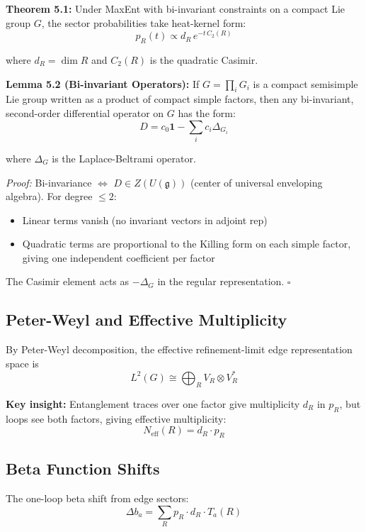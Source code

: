 \textbf{Theorem 5.1:} Under MaxEnt with bi-invariant constraints on a compact Lie group \(G\), the sector probabilities take heat-kernel form: \[p_R(t) \propto d_R \, e^{-t \, C_2(R)}\]

where \(d_R = \dim R\) and \(C_2(R)\) is the quadratic Casimir.

\textbf{Lemma 5.2 (Bi-invariant Operators):} If \(G=\prod_i G_i\) is a compact semisimple Lie group written as a product of compact simple factors, then any bi-invariant, second-order differential operator on \(G\) has the form: \[D = c_0 \mathbf{1} - \sum_i c_i \Delta_{G_i}\]

where \(\Delta_G\) is the Laplace-Beltrami operator.

\emph{Proof:} Bi-invariance \(\Leftrightarrow\) \(D \in Z(U(\mathfrak{g}))\) (center of universal enveloping algebra). For degree \(\leq 2\):

\begin{itemize}
\tightlist
\item
 Linear terms vanish (no invariant vectors in adjoint rep)
\item
 Quadratic terms are proportional to the Killing form on each simple factor, giving one independent coefficient per factor
\end{itemize}

The Casimir element acts as \(-\Delta_G\) in the regular representation. \(\square\)

\subsection{Peter-Weyl and Effective Multiplicity}\label{54-peter-weyl-and-effective-multiplicity}

By Peter-Weyl decomposition, the effective refinement-limit edge representation space is
\[L^2(G) \cong \bigoplus_R V_R \otimes V_R^*\]

\textbf{Key insight:} Entanglement traces over one factor give multiplicity \(d_R\) in \(p_R\), but loops see both factors, giving effective multiplicity: \[N_{\text{eff}}(R) = d_R \cdot p_R\]

\subsection{Beta Function Shifts}\label{55-beta-function-shifts}

The one-loop beta shift from edge sectors: \[\Delta b_a = \sum_R p_R \cdot d_R \cdot T_a(R)\]

